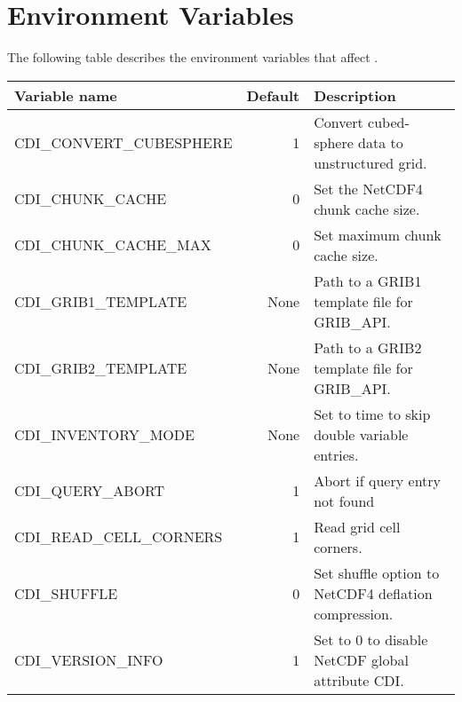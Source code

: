 \chapter{\label{environment}Environment Variables}

The following table describes the environment variables that affect {\CDI}.


\begin{tabular}[t]{|>{\columncolor{pcolor1}}l|r|l|}
\hline
\rowcolor{pcolor2}
{\bfseries Variable name}           &  {\bfseries Default} & {\bfseries Description} \\ \hline
CDI\_CONVERT\_CUBESPHERE &        1   & Convert cubed-sphere data to unstructured grid. \\
CDI\_CHUNK\_CACHE            &         0   & Set the NetCDF4 chunk cache size. \\
CDI\_CHUNK\_CACHE\_MAX  &         0   & Set maximum chunk cache size. \\
CDI\_GRIB1\_TEMPLATE          &   None   &  Path to a GRIB1 template file for GRIB\_API. \\
CDI\_GRIB2\_TEMPLATE          &   None   &  Path to a GRIB2 template file for GRIB\_API. \\
CDI\_INVENTORY\_MODE        &   None   &  Set to time to skip double variable entries. \\
CDI\_QUERY\_ABORT               &         1   &  Abort if query entry not found \\
 CDI\_READ\_CELL\_CORNERS  &         1   &  Read grid cell corners. \\
CDI\_SHUFFLE                            &         0   & Set shuffle option to NetCDF4 deflation compression. \\
CDI\_VERSION\_INFO               &         1   &  Set to 0 to disable NetCDF global attribute CDI.
\end{tabular}
